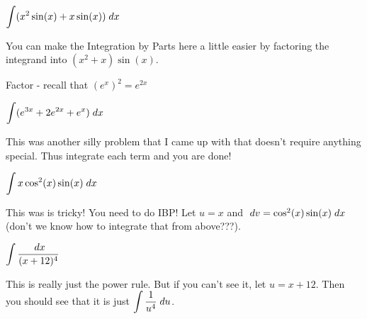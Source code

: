 \documentclass{ximera}
\newcommand{\du}{\; du}
\newcommand{\dv}{\; dv}
\begin{document}
\begin{problem}
$\displaystyle \int (x^2\sin(x) + x\sin(x)) \; dx$
\begin{multipleChoice}
\end{multipleChoice}
\begin{feedback}[correct]
You can make the Integration by Parts here a little easier by factoring the integrand into $(x^2+x)\sin(x)$.
\end{feedback}
\end{problem}
\begin{problem}
\begin{hint}
Factor - recall that $(e^x)^2 = e^{2x}$
\end{hint}
$\displaystyle \int (e^{3x} + 2e^{2x} + e^x) \; dx$
\begin{multipleChoice}
\end{multipleChoice}
\begin{feedback}[correct]
This was another silly problem that I came up with that doesn't require anything special. Thus integrate each term and you are done!
\end{feedback}
\end{problem}
\begin{problem}

$\displaystyle \int x\cos^2(x)\sin(x) \; dx$
\begin{multipleChoice}
\end{multipleChoice}
\begin{feedback}[correct]
This was is tricky! You need to do IBP! Let $u=x$ and $\dv = \cos^2(x)\sin(x) \dx$ (don't we know how to integrate that from above???).
\end{feedback}
\end{problem}
\begin{problem}
$\displaystyle \int \displaystyle\frac{\; dx}{(x+12)^4}$
\begin{multipleChoice}
\end{multipleChoice}
\begin{feedback}[correct]
This is really just the power rule. But if you can't see it, let $u=x+12$. Then you should see that it is just $\dint \df{1}{u^4} \du$.
\end{feedback}
\end{problem}
\end{document}
